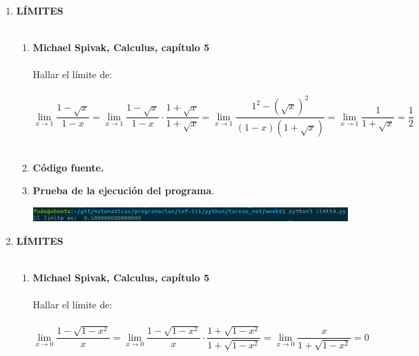 \begin{enumerate}
\begin{enumerate}[\bfseries a)]
    \end{enumerate}

\newpage

\item \textbf{\large LÍMITES}\\\\

    \begin{enumerate}[\bfseries a)]

	\item \textbf{\large Michael Spivak, Calculus, capítulo 5}\\\\
	    Hallar el límite de: \\\\
	    $\lim\limits_{x \to 1} \dfrac{1-\sqrt{x}}{1-x} =\lim\limits_{x \to 1} \dfrac{1-\sqrt{x}}{1-x}\cdot \dfrac{1+\sqrt{x}}{1+\sqrt{x}} =\lim\limits_{x \to 1} \dfrac{1^2 - (\sqrt{x})^2}{(1-x)(1+\sqrt{x})} =\lim\limits_{x \to 1} \dfrac{1}{1+\sqrt{x}} = \dfrac{1}{2}$\\\\
    
	\item \textbf{Código fuente.}\\ 
	    
	    
	    \vspace{.5cm}
	
	\item \textbf{Prueba de la ejecución del programa}.\\
	    \begin{center}
		\includegraphics[scale=.5]{imagenes/tareas_mat/week5/limit4.png}
	    \end{center}

    \end{enumerate}

\newpage

\item \textbf{\large LÍMITES}\\\\

    \begin{enumerate}[\bfseries a)]

	\item \textbf{\large Michael Spivak, Calculus, capítulo 5}\\\\
	    Hallar el límite de:\\\\
	    $\lim\limits_{x \to 0} \dfrac{1-\sqrt{1-x^2}}{x} =\lim\limits_{x \to 0} \dfrac{1-\sqrt{1-x^2}}{x} \cdot \dfrac{1+\sqrt{1-x^2}}{1+\sqrt{1-x^2}} =\lim\limits_{x \to 0} \dfrac{x}{1+\sqrt{1-x^2}} = 0$\\\\


\end{enumerate}
\end{enumerate}
